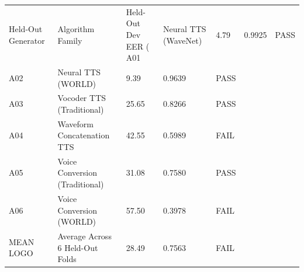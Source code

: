 \begin{tabular}{lllll}
\toprule
Held-Out Generator & Algorithm Family & Held-Out Dev EER (%
\midrule
A01 & Neural TTS (WaveNet) & 4.79 & 0.9925 & PASS \\
A02 & Neural TTS (WORLD) & 9.39 & 0.9639 & PASS \\
A03 & Vocoder TTS (Traditional) & 25.65 & 0.8266 & PASS \\
A04 & Waveform Concatenation TTS & 42.55 & 0.5989 & FAIL \\
A05 & Voice Conversion (Traditional) & 31.08 & 0.7580 & PASS \\
A06 & Voice Conversion (WORLD) & 57.50 & 0.3978 & FAIL \\
MEAN LOGO & Average Across 6 Held-Out Folds & 28.49 & 0.7563 & FAIL \\
\bottomrule
\end{tabular}
